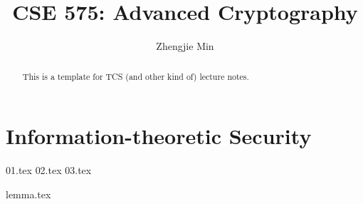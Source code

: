 \documentclass[a4paper]{report}
\author{Zhengjie Min}
\title{CSE 575: Advanced Cryptography}
\begin{document}
\maketitle

\begin{abstract}
	This is a template for TCS (and other kind of) lecture notes.
\end{abstract}

\newpage

\tableofcontents

\part{Information-theoretic Security}

{01.tex}
{02.tex}
{03.tex}

\newpage
\appendix
\appendixpage{}

{lemma.tex}
%

\newpage
\pagestyle{plain}
\printbibliography{}
\end{document}
